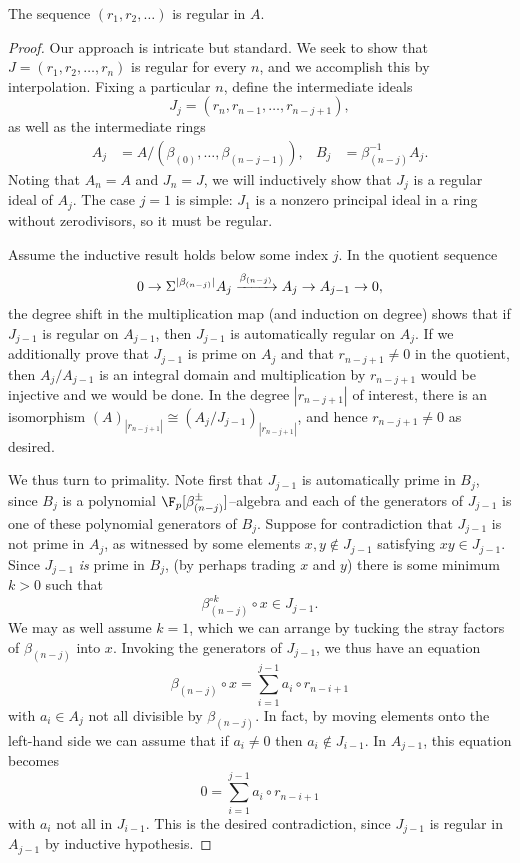 \begin{lemma}
The sequence $(r_1, r_2, \ldots)$ is regular in $A$.
\end{lemma}
\begin{proof}
Our approach is intricate but standard.  We seek to show that $J = (r_1, r_2, \ldots, r_n)$ is regular for every $n$, and we accomplish this by interpolation.  Fixing a particular $n$, define the intermediate ideals \[J_j = (r_n, r_{n-1}, \ldots, r_{n-j+1}),\] as well as the intermediate rings
\begin{align*}
A_j & = A / (\beta_{(0)}, \ldots, \beta_{(n-j-1)}), &
B_j & = \beta_{(n-j)}^{-1} A_j.
\end{align*}
Noting that $A_n = A$ and $J_n = J$, we will inductively show that $J_j$ is a regular ideal of $A_j$.  The case $j = 1$ is simple: $J_1$ is a nonzero principal ideal in a ring without zerodivisors, so it must be regular.

Assume the inductive result holds below some index $j$.  In the quotient sequence \[0 \to \Sigma^{|\beta_{(n-j)}|} A_j \xrightarrow{\beta_{(n-j)}} A_j \to A_{j-1} \to 0,\] the degree shift in the multiplication map (and induction on degree) shows that if $J_{j-1}$ is regular on $A_{j-1}$, then $J_{j-1}$ is automatically regular on $A_j$.  If we additionally prove that $J_{j-1}$ is prime on $A_j$ and that $r_{n-j+1} \ne 0$ in the quotient, then $A_j / A_{j-1}$ is an integral domain and multiplication by $r_{n-j+1}$ would be injective and we would be done.  In the degree $|r_{n-j+1}|$ of interest, there is an isomorphism $(A)_{|r_{n-j+1}|} \cong (A_j / J_{j-1})_{|r_{n-j+1}|}$, and hence $r_{n-j+1} \ne 0$ as desired.

We thus turn to primality.  Note first that $J_{j-1}$ is automatically prime in $B_j$, since $B_j$ is a polynomial $\F_p[\beta_{(n-j)}^\pm]$--algebra and each of the generators of $J_{j-1}$ is one of these polynomial generators of $B_j$.  Suppose for contradiction that $J_{j-1}$ is not prime in $A_j$, as witnessed by some elements $x, y \not\in J_{j-1}$ satisfying $xy \in J_{j-1}$.  Since $J_{j-1}$ \emph{is} prime in $B_j$, (by perhaps trading $x$ and $y$) there is some minimum $k > 0$ such that \[\beta_{(n-j)}^{\circ k} \circ x \in J_{j-1}.\]  We may as well assume $k = 1$, which we can arrange by tucking the stray factors of $\beta_{(n-j)}$ into $x$.  Invoking the generators of $J_{j-1}$, we thus have an equation \[\beta_{(n-j)} \circ x = \sum_{i = 1}^{j-1} a_i \circ r_{n-i+1}\] with $a_i \in A_j$ not all divisible by $\beta_{(n-j)}$.  In fact, by moving elements onto the left-hand side we can assume that if $a_i \ne 0$ then $a_i \not\in J_{i-1}$.  In $A_{j-1}$, this equation becomes \[0 = \sum_{i=1}^{j-1} a_i \circ r_{n-i+1}\] with $a_i$ not all in $J_{i-1}$.  This is the desired contradiction, since $J_{j-1}$ is regular in $A_{j-1}$ by inductive hypothesis.
\end{proof}

